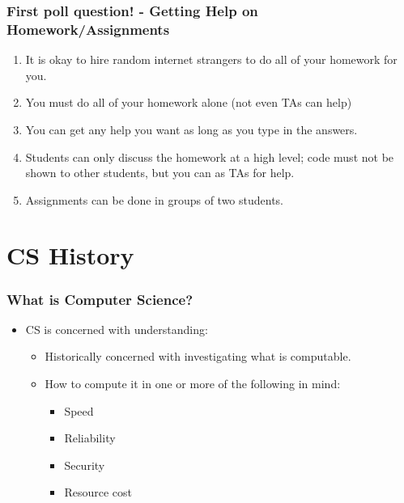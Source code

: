 \documentclass{beamer}
\begin{document}
\begin{frame}
  \frametitle{First poll question! - Getting Help on Homework/Assignments}
  \begin{enumerate}
    \item It is okay to hire random internet strangers to do all of your homework for you.
    \item You must do all of your homework alone (not even TAs can help)
    \item You can get any help you want as long as you type in the answers.
    \item Students can only discuss the homework at a high level; code must not be shown to other students, but you can as TAs for help.
    \item Assignments can be done in groups of two students.
  \end{enumerate}
\end{frame}

\section{CS History}

%
%
\begin{frame}
  \frametitle{What is Computer Science?}
  \begin{itemize}
    \item CS is concerned with understanding:
      \begin{itemize}
      \item Historically concerned with investigating what is computable.
      \item How to compute it in one or more of the following in mind:
        \begin{itemize}
        \item Speed
        \item Reliability
        \item Security 
        \item Resource cost
      \end{itemize}
  \end{itemize}
  \end{itemize}
\end{frame}
\end{document}

